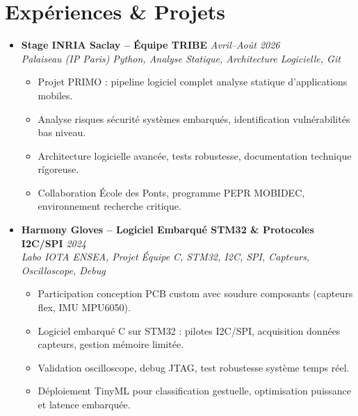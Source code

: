 \documentclass[a4paper,11pt]{article}
\begin{document}
\section{Exp\'eriences \& Projets}
\begin{itemize}[leftmargin=*, label={-}]
    \item \textbf{Stage INRIA Saclay -- \'Equipe TRIBE} \hfill \textit{Avril--Ao\^ut 2026} \\
    \textit{Palaiseau (IP Paris)} \hfill \textit{Python, Analyse Statique, Architecture Logicielle, Git}
    \vspace{-2pt}
        \begin{itemize}[leftmargin=0.4cm, nosep, label=\tiny$\bullet$]
            \item \small{Projet PRIMO : pipeline logiciel complet analyse statique d'applications mobiles.}
            \item \small{Analyse risques s\'ecurit\'e syst\`emes embarqu\'es, identification vulnérabilit\'es bas niveau.}
            \item \small{Architecture logicielle avanc\'ee, tests robustesse, documentation technique r\'igoreuse.}
            \item \small{Collaboration \'Ecole des Ponts, programme PEPR MOBIDEC, environnement recherche critique.}
        \end{itemize}
    \vspace{3pt}
    \item \textbf{Harmony Gloves -- Logiciel Embarqu\'e STM32 \& Protocoles I2C/SPI} \hfill \textit{2024} \\
    \textit{Labo IOTA ENSEA, Projet \'Equipe} \hfill \textit{C, STM32, I2C, SPI, Capteurs, Oscilloscope, Debug}
    \vspace{-2pt}
        \begin{itemize}[leftmargin=0.4cm, nosep, label=\tiny$\bullet$]
            \item \small{Participation conception PCB custom avec soudure composants (capteurs flex, IMU MPU6050).}
            \item \small{Logiciel embarqu\'e C sur STM32 : pilotes I2C/SPI, acquisition donn\'ees capteurs, gestion mémoire limit\'ee.}
            \item \small{Validation oscilloscope, debug JTAG, test robustesse syst\`eme temps r\'eel.}
            \item \small{D\'eploiement TinyML pour classification gestuelle, optimisation puissance et latence embarqu\'ee.}
        \end{itemize}

\end{itemize}
\end{document}
